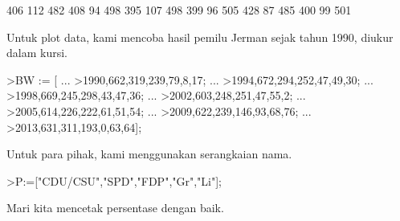 \documentclass{article}
\begin{document}
\begin{eulernotebook}
\begin{eulercomment}
\begin{eulercomment}
\begin{euleroutput}
            406           112           482 
            408            94           498 
            395           107           498 
            399            96           505 
            428            87           485 
            400            99           501 
\end{euleroutput}
\begin{eulercomment}
Untuk plot data, kami mencoba hasil pemilu Jerman sejak tahun 1990,
diukur dalam kursi.
\end{eulercomment}
\begin{eulerprompt}
>BW := [ ...
>1990,662,319,239,79,8,17; ...
>1994,672,294,252,47,49,30; ...
>1998,669,245,298,43,47,36; ...
>2002,603,248,251,47,55,2; ...
>2005,614,226,222,61,51,54; ...
>2009,622,239,146,93,68,76; ...
>2013,631,311,193,0,63,64];
\end{eulerprompt}
\begin{eulercomment}
Untuk para pihak, kami menggunakan serangkaian nama.
\end{eulercomment}
\begin{eulerprompt}
>P:=["CDU/CSU","SPD","FDP","Gr","Li"];
\end{eulerprompt}
\begin{eulercomment}
Mari kita mencetak persentase dengan baik.


\end{eulercomment}
\end{eulercomment}
\end{eulercomment}
\end{eulernotebook}
\end{document}

